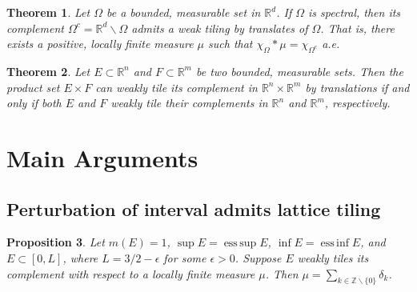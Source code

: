 \documentclass{amsart}
\newtheorem{theorem}{Theorem}[section]
\newtheorem{proposition}[theorem]{Proposition}
\DeclareMathOperator{\essinf}{ess\, inf}
\DeclareMathOperator{\esssup}{ess\,sup}
\begin{document}
\begin{theorem}
    Let $\Omega$ be a bounded, measurable set in $\mathbb{R}^d$. If $\Omega$ is spectral, then its complement $\Omega^c=\mathbb{R}^d\smallsetminus\Omega$ admits a weak tiling by translates of $\Omega$. That is, there exists a positive, locally finite measure $\mu$ such that $\chi_\Omega*\mu=\chi_{\Omega^c}$ a.e.
\end{theorem}

\begin{theorem}
    Let $E\subset \mathbb{R}^n$ and $F\subset\mathbb{R}^m$ be two bounded, measurable sets. Then the product set $E\times F$ can weakly tile its complement in $\mathbb{R}^n\times\mathbb{R}^m$ by translations if and only if both $E$ and $F$ weakly tile their complements in $\mathbb{R}^n$ and $\mathbb{R}^m$, respectively.
\end{theorem}





\section{Main Arguments}\label{s:main}


\subsection{Perturbation of interval admits lattice tiling} 

\begin{proposition}
Let $m(E)=1$, $\sup E=\esssup E$, $\inf E=\essinf E$, and $E\subset [0,L]$, where $L=3/2-\epsilon$ for some $\epsilon>0$. Suppose $E$ weakly tiles its complement with respect to a locally finite measure $\mu$. Then $\mu=\sum_{k\in\mathbb{Z}\smallsetminus \{0\}}\delta_k$.
\end{proposition}
\end{document}
